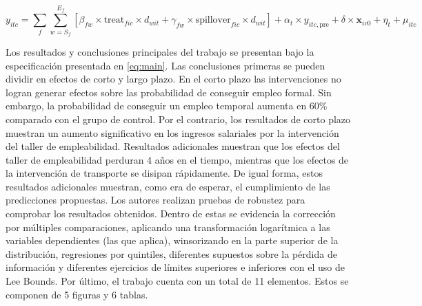 \documentclass{article}
\begin{document}
    \begin{equation}
        y_{itc} = \sum_{f} \sum_{w=S_f}^{E_f}\left[\beta_{fw}\times\text{treat}_{fic}\times d_{wit}+\gamma_{fw}\times\text{spillover}_{fic}\times d_{wit}\right] + \alpha_t\times y_{itc,\text{pre}} + \delta\times\mathbf{x}_{ic0} + \eta_t + \mu_{itc} \label{eq:second}
    \end{equation}

    Los resultados y conclusiones principales del trabajo se presentan bajo la especificación presentada en \ref{eq:main}. Las conclusiones primeras se pueden dividir en efectos de corto y largo plazo. En el corto plazo las intervenciones no logran generar efectos sobre las probabilidad de conseguir empleo formal. Sin embargo, la probabilidad de conseguir un empleo temporal aumenta en 60\% comparado con el grupo de control. Por el contrario, los resultados de corto plazo muestran un aumento significativo en los ingresos salariales por la intervención del taller de empleabilidad. Resultados adicionales muestran que los efectos del taller de empleabilidad perduran 4 años en el tiempo, mientras que los efectos de la intervención de transporte se disipan rápidamente. De igual forma, estos resultados adicionales muestran, como era de esperar, el cumplimiento de las predicciones propuestas. Los autores realizan pruebas de robustez para comprobar los resultados obtenidos. Dentro de estas se evidencia la corrección por múltiples comparaciones, aplicando una transformación logarítmica a las variables dependientes (las que aplica), winsorizando en la parte superior de la distribución, regresiones por quintiles, diferentes supuestos sobre la pérdida de información y diferentes ejercicios de límites superiores e inferiores con el uso de Lee Bounds. Por último, el trabajo cuenta con un total de 11 elementos. Estos se componen de 5 figuras y 6 tablas.
    
\end{document}
